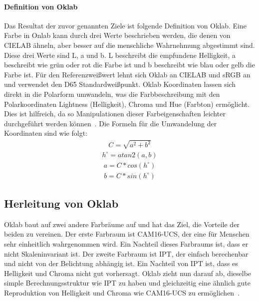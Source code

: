 \documentclass[12pt, a4paper, ngerman]{article}
\begin{document}
\paragraph{Definition von Oklab}
Das Resultat der zuvor genannten Ziele ist folgende Definition von Oklab.
Eine Farbe in Onlab kann durch drei Werte beschrieben werden, die denen von CIELAB ähneln, 
aber besser auf die menschliche Wahrnehmung abgestimmt sind.
Diese drei Werte sind L, a und b. 
L beschreibt die empfundene Helligkeit, a beschreibt wie grün oder rot die Farbe ist und b beschreibt wie blau oder gelb die Farbe ist.
Für den Referenzweißwert lehnt sich Oklab an CIELAB und sRGB an und verwendet den D65 Standardweißpunkt.
Oklab Koordinaten lassen sich direkt in die Polarform umwandeln, 
was die Farbbeschreibung mit den Polarkoordinaten Lightness (Helligkeit), Chroma und Hue (Farbton) ermöglicht.
Dies ist hilfreich, da so Manipulationen dieser Farbeigenschaften leichter durchgeführt werden können~\cite{Oklab_2020}.
Die Formeln für die Umwandelung der Koordinaten sind wie folgt:
\begin{equation}
  \begin{aligned}
    C=\sqrt{ a^2 + b^2 }
  \end{aligned}
\end{equation}
\begin{equation}
  \begin{aligned}
    h^\circ = atan2\left( a, b \right)
  \end{aligned}
\end{equation}
\begin{equation}
  \begin{aligned}
    a = C*cos\left( h^\circ \right)
  \end{aligned}
\end{equation}
\begin{equation}
  \begin{aligned}
    b = C*sin\left( h^\circ \right)
  \end{aligned}
\end{equation}


\subsection{Herleitung von Oklab}
Oklab baut auf zwei andere Farbräume auf und hat das Ziel, die Vorteile der beiden zu vereinen.
Der erste Farbraum ist \acs{CAM}16-UCS, der eine für Menschen sehr einheitlich wahrgenommen wird.
Ein Nachteil dieses Farbraums ist, dass er nicht Skaleninvariant ist.
Der zweite Farbraum ist IPT, der einfach berechenbar und nicht von der Belichtung abhängig ist.
Ein Nachteil von IPT ist, dass es Helligkeit und Chroma nicht gut vorhersagt.
Oklab zieht nun darauf ab, dieselbe simple Berechnungsstruktur wie IPT zu haben und 
gleichzeitig eine ähnlich gute Reproduktion von Helligkeit und Chroma wie CAM16-UCS zu ermöglichen~\cite{Oklab_2020}.
\end{document}
